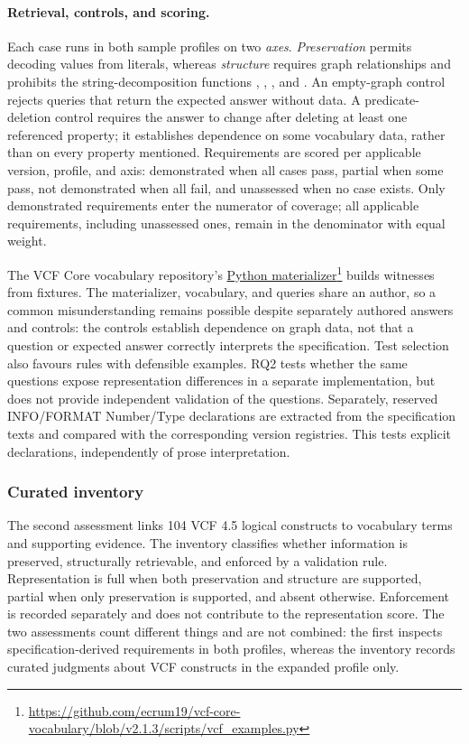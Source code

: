 \paragraph{Retrieval, controls, and scoring.}
Each case runs in both sample profiles on two \emph{axes}.
\emph{Preservation} permits decoding values from literals, whereas \emph{structure} requires graph relationships and prohibits the string-decomposition functions , , , and .
An empty-graph control rejects queries that return the expected answer without data.
A predicate-deletion control requires the answer to change after deleting at least one referenced property; it establishes dependence on some vocabulary data, rather than on every property mentioned.
Requirements are scored per applicable version, profile, and axis: demonstrated when all cases pass, partial when some pass, not demonstrated when all fail, and unassessed when no case exists.
Only demonstrated requirements enter the numerator of coverage; all applicable requirements, including unassessed ones, remain in the denominator with equal weight.

The VCF Core vocabulary repository's \href{https://github.com/ecrum19/vcf-core-vocabulary/blob/v2.1.3/scripts/vcf_examples.py}{Python materializer}\footnote{\url{https://github.com/ecrum19/vcf-core-vocabulary/blob/v2.1.3/scripts/vcf_examples.py}} builds witnesses from fixtures.
The materializer, vocabulary, and queries share an author, so a common misunderstanding remains possible despite separately authored answers and controls: the controls establish dependence on graph data, not that a question or expected answer correctly interprets the specification.
Test selection also favours rules with defensible examples.
RQ2 tests whether the same questions expose representation differences in a separate implementation, but does not provide independent validation of the questions.
Separately, reserved INFO/FORMAT Number/Type declarations are extracted from the specification texts and compared with the corresponding version registries.
This tests explicit declarations, independently of prose interpretation.

\subsubsection{Curated inventory}
The second assessment links 104 VCF 4.5 logical constructs to vocabulary terms and supporting evidence.
The inventory classifies whether information is preserved, structurally retrievable, and enforced by a validation rule.
Representation is full when both preservation and structure are supported, partial when only preservation is supported, and absent otherwise.
Enforcement is recorded separately and does not contribute to the representation score.
The two assessments count different things and are not combined: the first inspects specification-derived requirements in both profiles, whereas the inventory records curated judgments about VCF constructs in the expanded profile only.

